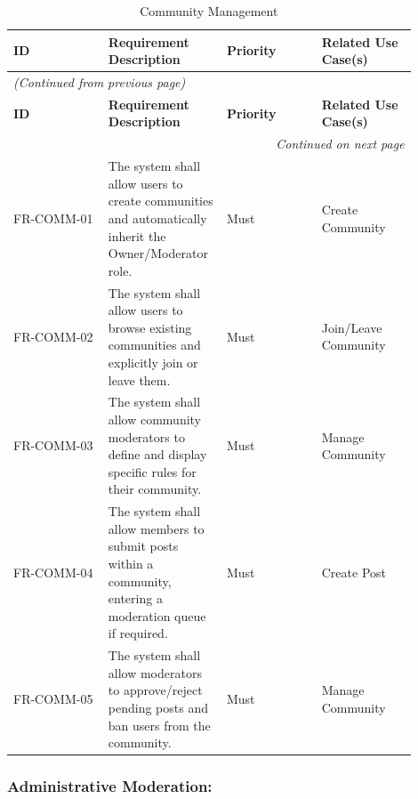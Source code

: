 \begin{longtable}{|p{0.225\linewidth}|p{0.225\linewidth}|p{0.225\linewidth}|p{0.225\linewidth}|}
\caption{Community Management} \label{tab:13} \\
\hline
\textbf{ID} & \textbf{Requirement Description} & \textbf{Priority} & \textbf{Related Use Case(s)} \\
\hline
\endfirsthead
\multicolumn{4}{l}{\textit{(Continued from previous page)}} \\
\hline
\textbf{ID} & \textbf{Requirement Description} & \textbf{Priority} & \textbf{Related Use Case(s)} \\
\hline
\endhead
\hline \multicolumn{4}{r}{\textit{Continued on next page}} \\
\endfoot
\hline
\endlastfoot
FR-COMM-01 & The system shall allow users to create communities and automatically inherit the Owner/Moderator role. & Must & Create Community \\
\hline
FR-COMM-02 & The system shall allow users to browse existing communities and explicitly join or leave them. & Must & Join/Leave Community \\
\hline
FR-COMM-03 & The system shall allow community moderators to define and display specific rules for their community. & Must & Manage Community \\
\hline
FR-COMM-04 & The system shall allow members to submit posts within a community, entering a moderation queue if required. & Must & Create Post \\
\hline
FR-COMM-05 & The system shall allow moderators to approve/reject pending posts and ban users from the community. & Must & Manage Community \\
\hline
\end{longtable}


\subsubsection{Administrative Moderation:}

